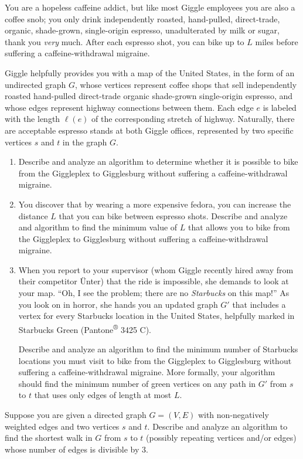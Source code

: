 \begin{exercises}
You are a hopeless caffeine addict, but like most Giggle employees you are also a coffee snob; you only drink independently roasted, hand-pulled, direct-trade, organic, shade-grown, single-origin espresso, unadulterated by milk or sugar, thank you \textit{very} much.
After each espresso shot, you can bike up to $L$ miles before suffering a caffeine-withdrawal migraine.

Giggle helpfully provides you with a map of the United States, in the form of an undirected graph $G$, whose vertices represent coffee shops that sell independently roasted hand-pulled direct-trade organic shade-grown single-origin espresso, and whose edges represent highway connections between them.
Each edge $e$ is labeled with the length $\ell(e)$ of the corresponding stretch of highway.
Naturally, there are acceptable espresso stands at both Giggle offices, represented by two specific vertices $s$ and $t$ in the graph $G$.
\begin{enumerate}
\item Describe and analyze an algorithm to determine whether it is possible to bike from the Giggleplex to Gigglesburg without suffering a caffeine-withdrawal migraine.
\item You discover that by wearing a more expensive fedora, you can increase the distance $L$ that you can bike between espresso shots.
Describe and analyze and algorithm to find the minimum value of $L$ that allows you to bike from the Giggleplex to Gigglesburg without suffering a caffeine-withdrawal migraine.
\item When you report to your supervisor (whom Giggle recently hired away from their competitor Ünter) that the ride is impossible, she demands to look at your map.
“Oh, I see the problem; there are no \textit{Starbucks} on this map!” As you look on in horror, she hands you an updated graph $G'$ that includes a vertex for every Starbucks location in the United States, helpfully marked in Starbucks Green (Pantone\textsuperscript{®} 3425 C).

Describe and analyze an algorithm to find the minimum number of Starbucks locations you must visit to bike from the Giggleplex to Gigglesburg without suffering a caffeine-withdrawal migraine.
More formally, your algorithm should find the minimum number of green vertices on any path in $G'$ from $s$ to $t$ that uses only edges of length at most $L$.
\end{enumerate}

\item Suppose you are given a directed graph $G = (V, E)$ with non-negatively weighted edges and two vertices $s$ and $t$.
Describe and analyze an algorithm to find the shortest walk in $G$ from $s$ to $t$ (possibly repeating vertices and/or edges) whose number of edges is divisible by $3$.


\end{exercises}
